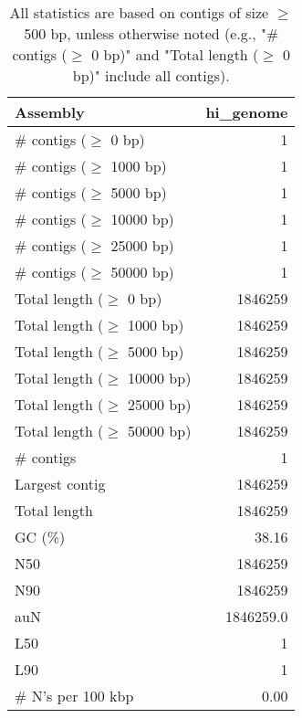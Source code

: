 \documentclass[12pt,a4paper]{article}
\begin{document}
\begin{table}[ht]
\begin{center}
\caption{All statistics are based on contigs of size $\geq$ 500 bp, unless otherwise noted (e.g., "\# contigs ($\geq$ 0 bp)" and "Total length ($\geq$ 0 bp)" include all contigs).}
\begin{tabular}{|l*{1}{|r}|}
\hline
Assembly & hi\_genome \\ \hline
\# contigs ($\geq$ 0 bp) & 1 \\ \hline
\# contigs ($\geq$ 1000 bp) & 1 \\ \hline
\# contigs ($\geq$ 5000 bp) & 1 \\ \hline
\# contigs ($\geq$ 10000 bp) & 1 \\ \hline
\# contigs ($\geq$ 25000 bp) & 1 \\ \hline
\# contigs ($\geq$ 50000 bp) & 1 \\ \hline
Total length ($\geq$ 0 bp) & 1846259 \\ \hline
Total length ($\geq$ 1000 bp) & 1846259 \\ \hline
Total length ($\geq$ 5000 bp) & 1846259 \\ \hline
Total length ($\geq$ 10000 bp) & 1846259 \\ \hline
Total length ($\geq$ 25000 bp) & 1846259 \\ \hline
Total length ($\geq$ 50000 bp) & 1846259 \\ \hline
\# contigs & 1 \\ \hline
Largest contig & 1846259 \\ \hline
Total length & 1846259 \\ \hline
GC (\%) & 38.16 \\ \hline
N50 & 1846259 \\ \hline
N90 & 1846259 \\ \hline
auN & 1846259.0 \\ \hline
L50 & 1 \\ \hline
L90 & 1 \\ \hline
\# N's per 100 kbp & 0.00 \\ \hline
\end{tabular}
\end{center}
\end{table}
\end{document}
